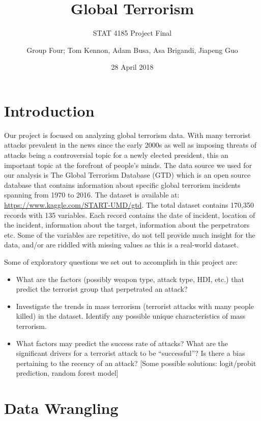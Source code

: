 \documentclass[11pt,letterpaper,]{article}
\title{Global Terrorism}
\subtitle{STAT 4185 Project Final}
\author{Group Four; Tom Kennon, Adam Busa, Asa Brigandi, Jiapeng Guo}
\date{28 April 2018}
\providecommand{\tightlist}{%
  \setlength{\itemsep}{0pt}\setlength{\parskip}{0pt}}
\theoremstyle{definition}
\theoremstyle{definition}
\theoremstyle{definition}
\theoremstyle{remark}
\begin{document}
\maketitle

{
\setcounter{tocdepth}{3}
\tableofcontents
}
\newpage

\section{Introduction}\label{sec:intro}

Our project is focused on analyzing global terrorism data. With many
terrorist attacks prevalent in the news since the early 2000s as well as
imposing threats of attacks being a controversial topic for a newly
elected president, this an important topic at the forefront of people's
minds. The data source we used for our analysis is The Global Terrorism
Database (GTD) which is an open source database that contains
information about specific global terrorism incidents spanning from 1970
to 2016. The dataset is available at:
\url{https://www.kaggle.com/START-UMD/gtd}. The total dataset contains
170,350 records with 135 variables. Each record contains the date of
incident, location of the incident, information about the target,
information about the perpetrators etc. Some of the variables are
repetitive, do not tell provide much insight for the data, and/or are
riddled with missing values as this is a real-world dataset.

Some of exploratory questions we set out to accomplish in this project
are:

\begin{itemize}
\tightlist
\item
  What are the factors (possibly weapon type, attack type, HDI, etc.)
  that predict the terrorist group that perpetrated an attack?
\item
  Investigate the trends in mass terrorism (terrorist attacks with many
  people killed) in the dataset. Identify any possible unique
  characteristics of mass terrorism.
\item
  What factors may predict the success rate of attacks? What are the
  significant drivers for a terrorist attack to be ``successful''? Is
  there a bias pertaining to the recency of an attack? {[}Some possible
  solutions: logit/probit prediction, random forest model{]}
\end{itemize}

\section{Data Wrangling}\label{sec:data_wrangling}
\end{document}
